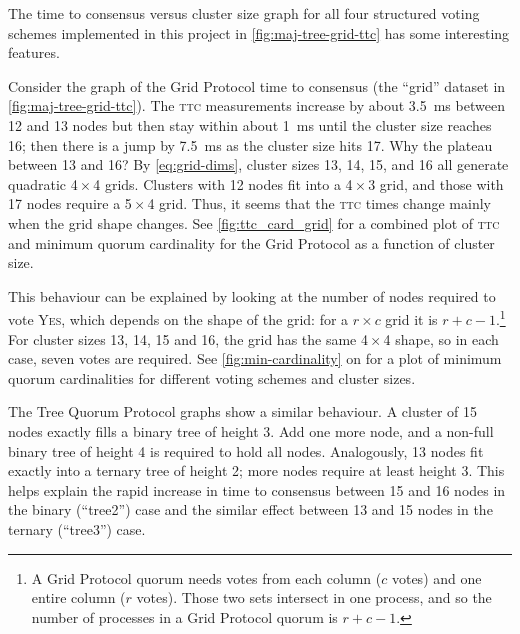 \documentclass[12pt,chapterprefix=true,toc=bibliography,numbers=noendperiod,
               footnotes=multiple,twoside]{scrreprt}
\newcommand{\yes}{{\fontfamily{jkposn}\selectfont\textsc{Yes}}}
\begin{document}

The time to consensus versus cluster size graph for all four structured voting schemes implemented in this project in \cref{fig:maj-tree-grid-ttc} has some interesting features.

Consider the graph of the Grid Protocol time to consensus (the \enquote{grid} dataset in \cref{fig:maj-tree-grid-ttc}). The \textsc{ttc} measurements increase by about \SI{3.5}{\milli\second} between 12 and 13 nodes but then stay within about \SI{1}{\milli\second} until the cluster size reaches 16; then there is a jump by \SI{7.5}{\milli\second} as the cluster size hits 17. Why the plateau between 13 and 16? By \cref{eq:grid-dims}, cluster sizes 13, 14, 15, and 16 all generate quadratic 4\,\(\times\)\,4 grids. Clusters with 12 nodes fit into a 4\,\(\times\)\,3 grid, and those with 17 nodes require a 5\,\(\times\)\,4 grid. Thus, it seems that the \textsc{ttc} times change mainly when the grid shape changes. See \cref{fig:ttc_card_grid} for a combined plot of \textsc{ttc} and minimum quorum cardinality for the Grid Protocol as a function of cluster size.

This behaviour can be explained by looking at the number of nodes required to vote \yes, which depends on the shape of the grid: for a \(r \times c\) grid it is \(r + c - 1\).\footnote{A Grid Protocol quorum needs votes from each column  (\(c\) votes) and one entire column (\(r\) votes). Those two sets intersect in one process, and so the number of processes in a Grid Protocol quorum is \(r + c - 1\).} For cluster sizes 13, 14, 15 and 16, the grid has the same 4\,\(\times\)\,4 shape, so in each case, seven votes are required. See \cref{fig:min-cardinality} on  for a plot of minimum quorum cardinalities for different voting schemes and cluster sizes.


The Tree Quorum Protocol graphs show a similar behaviour. A cluster of 15 nodes exactly fills a binary tree of height 3. Add one more node, and a non-full binary tree of height 4 is required to hold all nodes. Analogously, 13 nodes fit exactly into a ternary tree of height 2; more nodes require at least height 3. This helps explain the rapid increase in time to consensus between 15 and 16 nodes in the binary (\enquote{tree2}) case and the similar effect between 13 and 15 nodes in the ternary (\enquote{tree3}) case.
\end{document}
